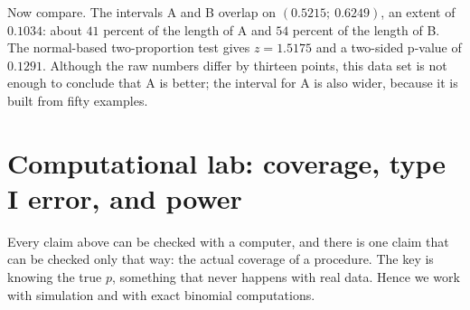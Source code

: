 Now compare. The intervals A and B overlap on $(0.5215;\ 0.6249)$, an extent of
$0.1034$: about $41$ percent of the length of A and $54$ percent of the length of B. The
normal-based two-proportion test gives $z=1.5175$ and a two-sided p-value of $0.1291$.
Although the raw numbers differ by thirteen points, this data set is not enough to conclude
that A is better; the interval for A is also wider, because it is built from fifty examples.


\section{Computational lab: coverage, type I error, and power}

Every claim above can be checked with a computer, and there is one claim that can be checked
only that way: the actual coverage of a procedure. The key is knowing the true $p$, something
that never happens with real data. Hence we work with simulation and with exact binomial
computations.

